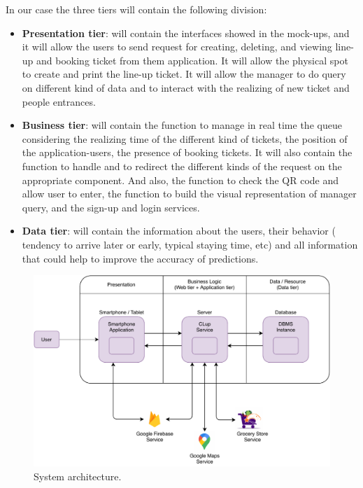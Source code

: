 In our case the three tiers will contain the following division:
\begin{itemize}
    \item \textbf{Presentation tier}: will contain the interfaces showed in the mock-ups, and it will allow the users to send request for creating, deleting, and viewing line-up and booking ticket from them application. It will allow the physical spot to create and print the line-up ticket. It will allow the manager to do query on different kind of data and to interact with the realizing of new ticket and people entrances.

    \item \textbf{Business tier}: will contain the function to manage in real time the queue considering the realizing time of the different kind of tickets, the position of the application-users, the presence of booking tickets. It will also contain the function to handle and to redirect the different kinds of the request on the appropriate component. And also, the function to check the QR code and allow user to enter, the function to build the visual representation of manager query, and the sign-up and login services.

    \item \textbf{Data tier}: will contain the information about the users, their behavior ( tendency to arrive later or early, typical staying time, etc) and all information that could help to improve the accuracy of predictions.
\end{itemize}

\begin{figure}[H]
    \centering
    \includegraphics[width=1.0\textwidth]{images/architecture.pdf}
    \caption{System architecture.}
\end{figure}


